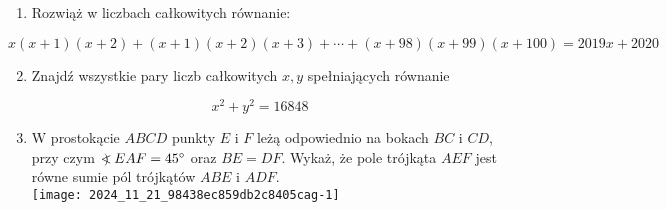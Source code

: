 \documentclass[10pt]{article}
\newcommand\Varangle{\mathop{{<\!\!\!\!\!\text{\small)}}\:}\nolimits}
\begin{document}
\begin{enumerate}
  \item Rozwiąż w liczbach całkowitych równanie:
\end{enumerate}

\[
x(x+1)(x+2)+(x+1)(x+2)(x+3)+\cdots+(x+98)(x+99)(x+100)=2019 x+2020
\]

\begin{enumerate}
  \setcounter{enumi}{1}
  \item Znajdź wszystkie pary liczb całkowitych \(x, y\) spełniających równanie
\end{enumerate}

\[
x^{2}+y^{2}=16848
\]

\begin{enumerate}
  \setcounter{enumi}{2}
  \item W prostokącie \(A B C D\) punkty \(E\) i \(F\) leżą odpowiednio na bokach \(B C\) i \(C D\), przy czym \(\Varangle E A F=45^{\circ}\) oraz \(B E=D F\). Wykaż, że pole trójkąta \(A E F\) jest równe sumie pól trójkątów \(A B E\) i \(A D F\).\\
\texttt{[image: 2024\_11\_21\_98438ec859db2c8405cag-1]}
\end{enumerate}
\end{document}
